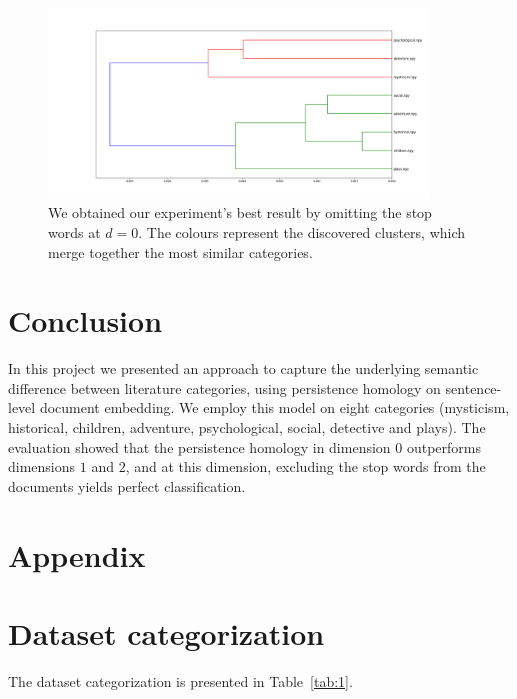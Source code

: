 \documentclass[fleqn]{article}
\begin{document}
\begin{figure}
    \centering
    \includegraphics[width=0.9\textwidth]{figures/stopwords_excluded/dendrogram_d0.png}
    \caption{We obtained our experiment's best result by omitting the stop words at $d = 0$. The colours represent the discovered clusters, which merge together the most similar categories.}
    \label{fig:winner}
\end{figure}

\section{Conclusion} \label{conclusion}
In this project we presented an approach to capture the underlying semantic difference between literature categories, using persistence homology on sentence-level document embedding. We employ this model on eight categories (mysticism, historical, children, adventure, psychological, social, detective and plays). The evaluation showed that the persistence homology in dimension $0$ outperforms dimensions $1$ and $2$, and at this dimension, excluding the stop words from the documents yields perfect classification.

\section*{Appendix} \label{appendix}
\appendix
\section{Dataset categorization} \label{app:dataset}
The dataset categorization is presented in Table~\ref{tab:1}.
\end{document}
